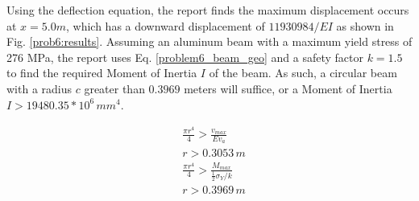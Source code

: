 \documentclass[a4paper]{article}
\begin{document}
Using the deflection equation, the report finds the maximum displacement occurs at $x = 5.0 m$, which has a downward displacement of $11930984/EI$ as shown in Fig. \ref{prob6:results}. Assuming an aluminum beam with a maximum yield stress of 276 MPa, the report uses Eq. \ref{problem6_beam_geo} and a safety factor $k=1.5$ to find the required Moment of Inertia $I$ of the beam. As such, a circular beam with a radius $c$ greater than $0.3969$ meters will suffice, or a Moment of Inertia $I > 19480.35 * 10^6\,{mm}^4$.

\begin{equation}
\begin{split}
& \frac{\pi r^4}{4} > \frac{v_{max}}{Ev_a} \\
& r > 0.3053\,m \\
& \frac{\pi r^4}{4} > \frac{M_{max}}{\frac{1}{2}\sigma_Y/ k}\\
& r > 0.3969\,m \\
\end{split}
\label{problem6_beam_geo}
\end{equation}
\end{document}
